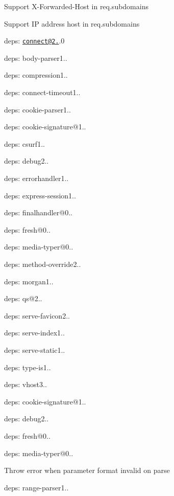\begin{DoxyItemize}
\item Support {\ttfamily X-\/\+Forwarded-\/\+Host} in {\ttfamily req.\+subdomains}
\item Support I\+P address host in {\ttfamily req.\+subdomains}
\item deps\+: \href{mailto:connect@2.26}{\tt connect@2.}.0
\begin{DoxyItemize}
\item deps\+: body-\/parser1..
\item deps\+: compression1..
\item deps\+: connect-\/timeout1..
\item deps\+: cookie-\/parser1..
\item deps\+: cookie-\/signature@1..
\item deps\+: csurf1..
\item deps\+: debug2..
\item deps\+: errorhandler1..
\item deps\+: express-\/session1..
\item deps\+: finalhandler@0..
\item deps\+: fresh@0..
\item deps\+: media-\/typer@0..
\item deps\+: method-\/override2..
\item deps\+: morgan1..
\item deps\+: qs@2..
\item deps\+: serve-\/favicon2..
\item deps\+: serve-\/index1..
\item deps\+: serve-\/static1..
\item deps\+: type-\/is1..
\item deps\+: vhost3..
\end{DoxyItemize}
\item deps\+: cookie-\/signature@1..
\item deps\+: debug2..
\item deps\+: fresh@0..
\item deps\+: media-\/typer@0..
\begin{DoxyItemize}
\item Throw error when parameter format invalid on parse
\end{DoxyItemize}
\item deps\+: range-\/parser1..

\end{DoxyItemize}
